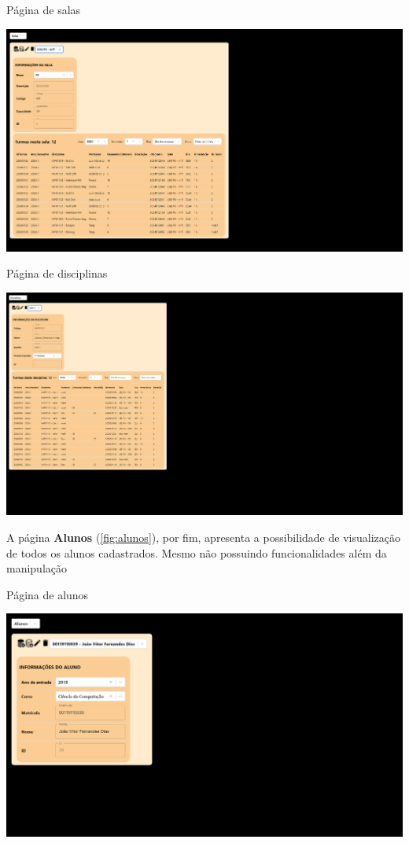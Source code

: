 \begin{MyCenteredFigure} \caption{Página de salas} \label{fig:salas}
  \includegraphics[width=\textwidth]{files/img/2.02!7-resultados/8-Salas.png}
\end{MyCenteredFigure}

\begin{MyCenteredFigure} \caption{Página de disciplinas} \label{fig:disciplinas}
  \includegraphics[width=\textwidth]{files/img/2.02!7-resultados/9-Disciplinas.png}
\end{MyCenteredFigure}

A página \textbf{Alunos} (\autoref{fig:alunos}), por fim, apresenta a possibilidade de visualização de todos os alunos cadastrados. Mesmo não possuindo funcionalidades além da manipulação 

\begin{MyCenteredFigure} \caption{Página de alunos} \label{fig:alunos}
  \includegraphics[width=\textwidth]{files/img/2.02!7-resultados/10-Aluno.png}
\end{MyCenteredFigure}

